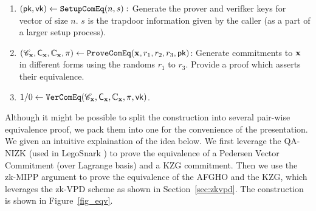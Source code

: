 \begin{enumerate}
	\item $(\mathsf{pk},\mathsf{vk}) \leftarrow {\texttt{SetupComEq}}(n, s):$ 
	Generate the prover and verifker keys for vector of size $n$.
	$s$ is the trapdoor information given by the caller (as a part
	of a larger setup process).

	\item $({\mathscr{C}}_{{{\mathbf {x}}}}, {\mathsf{C}}_{{{\mathbf {x}}}}, {\mathbb{C}}_{{{\mathbf {x}}}}, \pi) \leftarrow {\texttt{ProveComEq}}({{\mathbf {x}}}, r_1, r_2, r_3, \mathsf{pk})$: 
	Generate commitments to ${{\mathbf {x}}}$ in different forms using
	the randoms $r_1$ to $r_3$. Provide a proof which asserts
	their equivalence.

	\item $1/0 \leftarrow {\texttt{VerComEq}}({\mathscr{C}}_{{{\mathbf {x}}}}, 
		{\mathsf{C}}_{{{\mathbf {x}}}}, {\mathbb{C}}_{{{\mathbf {x}}}}, \pi, \mathsf{vk})$.
\end{enumerate}
\def\hp{\hspace*{0.1in}}

Although it might be possible to split the construction into
several pair-wise equivalence proof, we pack them into one
for the convenience of the presentation. We given an intuitive
explaination of the idea below.
We first leverage the QA-NIZK (used in 
LegoSnark \cite{LegoSnarkFull}) to prove the equivalence
of a Pedersen Vector Commitment (over Lagrange basis) and
a KZG commitment. Then we use the zk-MIPP argument to prove
the equivalence of the AFGHO and the KZG, which leverages
the zk-VPD scheme as shown in Section\ \ref{sec:zkvpd}. 
The construction is shown in Figure\ \ref{fig_eqv}.


